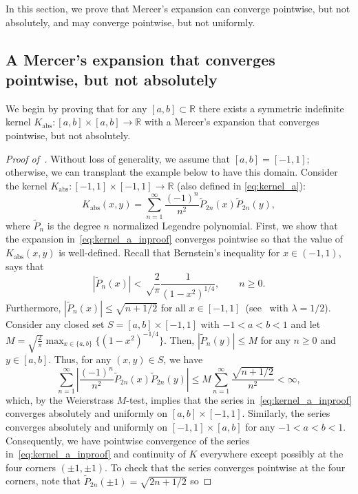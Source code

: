 \documentclass{article}
\begin{document}
In this section, we prove that Mercer's expansion can converge pointwise, but not absolutely, and may converge pointwise, but not uniformly. 

\subsection{A Mercer's expansion that converges pointwise, but not absolutely}
We begin by proving that for any $[a,b]\subset \mathbb{R}$ there exists a symmetric indefinite kernel $K_{\text{abs}}:[a,b]\times [a,b]\rightarrow\mathbb{R}$ with a Mercer's expansion that converges pointwise, but not absolutely. 

\begin{proof}[Proof of~]
Without loss of generality, we assume that $[a,b]=[-1,1]$; otherwise, we can transplant the example below to have this domain. Consider the kernel $K_{\text{abs}}:[-1, 1]\times [-1, 1]\to \mathbb{R}$ (also defined in \cref{eq:kernel_a}): 
\begin{equation}\label{eq:kernel_a_inproof}
    K_{\text{abs}}(x, y) = \sum_{n=1}^\infty \frac{(-1)^n}{n^2}\tilde{P}_{2n}(x)\tilde{P}_{2n}(y),
\end{equation}
where $\tilde{P}_n$ is the degree $n$ normalized Legendre polynomial. First, we show that the expansion in~\cref{eq:kernel_a_inproof} converges pointwise so that the value of $K_{\text{abs}}(x, y)$ is well-defined. Recall that Bernstein's inequality for $x\in(-1, 1)$, says that 
\begin{equation*}
    |\tilde{P}_n(x)| < \sqrt\frac{2}{\pi} \frac{1}{(1-x^2)^{1/4}}, \qquad n\geq 0. 
\end{equation*}
Furthermore, $|\tilde{P}_n(x)|\leq \sqrt{n+1/2}$ for all $x\in[-1,1]$~(see~\cite[18.14.4]{NIST:DLMF} with $\lambda=1/2$). Consider any closed set $S=[a, b]\times[-1, 1]$ with $-1<a< b<1$ and let $M = \sqrt{\frac{2}{\pi}}\max_{x\in\{a, b\}}\{(1-x^2)^{-1/4}\}$. Then, $|\tilde{P}_n(y)|\leq M$ for any $n\geq 0$ and $y\in[a,b]$. Thus, for any $(x, y)\in S$, we have 
\begin{equation*}
    \sum_{n=1}^\infty\left|\frac{(-1)^n}{n^2}\tilde{P}_{2n}(x)\tilde{P}_{2n}(y)\right|\leq M \sum_{n=1}^\infty \frac{\sqrt{n+1/2}}{n^2} <\infty,
\end{equation*}
which, by the Weierstrass $M$-test, implies that the series in~\cref{eq:kernel_a_inproof} converges absolutely and uniformly on $[a, b]\times [-1, 1]$. Similarly, the series converges absolutely and uniformly on $[-1, 1]\times [a, b]$ for any $-1<a<b<1$. Consequently, we have pointwise convergence of the series in~\cref{eq:kernel_a_inproof} and continuity of $K$  everywhere except possibly at the four corners $(\pm 1, \pm 1)$. To check that the series converges pointwise at the four corners, note that $\tilde{P}_{2n}(\pm 1) = \sqrt{2n+1/2}$ so 

\end{proof}
\end{document}
